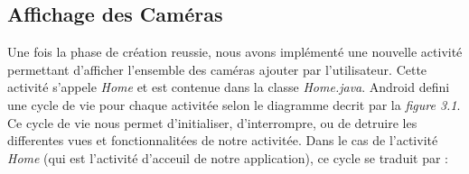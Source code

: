\subsection{Affichage des Caméras}
Une fois la phase de création reussie, nous avons implémenté une nouvelle
activité permettant d'afficher l'ensemble des caméras ajouter par l'utilisateur.
Cette activité s'appele \textit{Home} et est contenue dans la classe
\textit{Home.java}.\newline
Android defini une cycle de vie pour chaque activitée selon le diagramme
decrit par la \textit{figure 3.1}.
\newline
\indent Ce cycle de vie nous permet d'initialiser, d'interrompre, ou de detruire
les differentes vues et fonctionnalitées de notre activitée. Dans le cas de
l'activité \textit{Home} (qui est l'activité d'acceuil de notre application), ce cycle se traduit par : 
